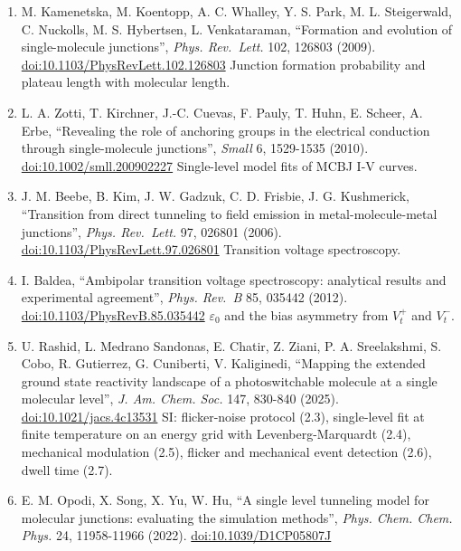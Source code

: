 \documentclass[
  11pt,
  a4paper,
]{article}
\begin{document}
\begin{enumerate}
\def\labelenumi{\arabic{enumi}.}
\setcounter{enumi}{25}
\item
  M. Kamenetska, M. Koentopp, A. C. Whalley, Y. S. Park, M. L.
  Steigerwald, C. Nuckolls, M. S. Hybertsen, L. Venkataraman,
  ``Formation and evolution of single-molecule junctions'', \emph{Phys.
  Rev.~Lett.} 102, 126803 (2009).
  \href{https://doi.org/10.1103/PhysRevLett.102.126803}{doi:10.1103/PhysRevLett.102.126803}
  Junction formation probability and plateau length with molecular
  length.
\item
  L. A. Zotti, T. Kirchner, J.-C. Cuevas, F. Pauly, T. Huhn, E. Scheer,
  A. Erbe, ``Revealing the role of anchoring groups in the electrical
  conduction through single-molecule junctions'', \emph{Small} 6,
  1529-1535 (2010).
  \href{https://doi.org/10.1002/smll.200902227}{doi:10.1002/smll.200902227}
  Single-level model fits of MCBJ I-V curves.
\item
  J. M. Beebe, B. Kim, J. W. Gadzuk, C. D. Frisbie, J. G. Kushmerick,
  ``Transition from direct tunneling to field emission in
  metal-molecule-metal junctions'', \emph{Phys. Rev.~Lett.} 97, 026801
  (2006).
  \href{https://doi.org/10.1103/PhysRevLett.97.026801}{doi:10.1103/PhysRevLett.97.026801}
  Transition voltage spectroscopy.
\item
  I. Baldea, ``Ambipolar transition voltage spectroscopy: analytical
  results and experimental agreement'', \emph{Phys. Rev.~B} 85, 035442
  (2012).
  \href{https://doi.org/10.1103/PhysRevB.85.035442}{doi:10.1103/PhysRevB.85.035442}
  $\varepsilon_0$ and the bias asymmetry from $V_t^{+}$ and $V_t^{-}$.
\item
  U. Rashid, L. Medrano Sandonas, E. Chatir, Z. Ziani, P. A.
  Sreelakshmi, S. Cobo, R. Gutierrez, G. Cuniberti, V. Kaliginedi,
  ``Mapping the extended ground state reactivity landscape of a
  photoswitchable molecule at a single molecular level'', \emph{J. Am.
  Chem. Soc.} 147, 830-840 (2025).
  \href{https://doi.org/10.1021/jacs.4c13531}{doi:10.1021/jacs.4c13531}
  SI: flicker-noise protocol (2.3), single-level fit at finite
  temperature on an energy grid with Levenberg-Marquardt (2.4),
  mechanical modulation (2.5), flicker and mechanical event detection
  (2.6), dwell time (2.7).
\item
  E. M. Opodi, X. Song, X. Yu, W. Hu, ``A single level tunneling model
  for molecular junctions: evaluating the simulation methods'',
  \emph{Phys. Chem. Chem. Phys.} 24, 11958-11966 (2022).
  \href{https://doi.org/10.1039/D1CP05807J}{doi:10.1039/D1CP05807J}

\end{enumerate}
\end{document}
